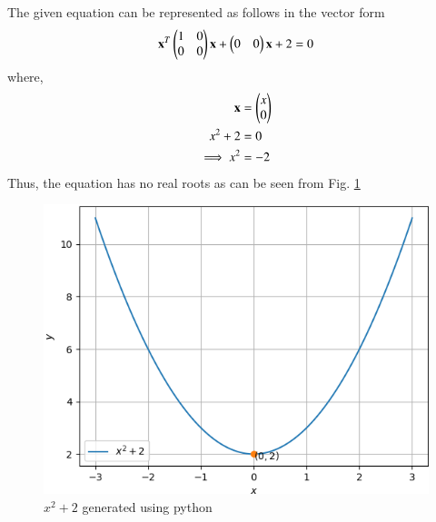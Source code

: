 The given equation can be represented as follows in the vector form
%
\begin{align}
\mathbf{x}^T 
\begin{pmatrix}
1 & 0 \\
0 & 0
\end{pmatrix}
\mathbf{x} + 
\begin{pmatrix}
0 & 0 
\end{pmatrix}
\mathbf{x} + 2 = 0
\end{align}
where,
\begin{align}
\mathbf{x} &= \begin{pmatrix}x\\0\end{pmatrix}\\
x^2 + 2 &= 0\\
\implies  x^2 &= -2
\end{align}
Thus, the equation has no real roots as can be seen from Fig. \ref{sep/2/21/plot}
\begin{figure}[!ht]
\centering
\includegraphics[width=\columnwidth]{solutions/sep/2/21/Figures/plot.png}
\caption{$x^2+2$ generated using python}
\label{sep/2/21/plot}
\end{figure} 


